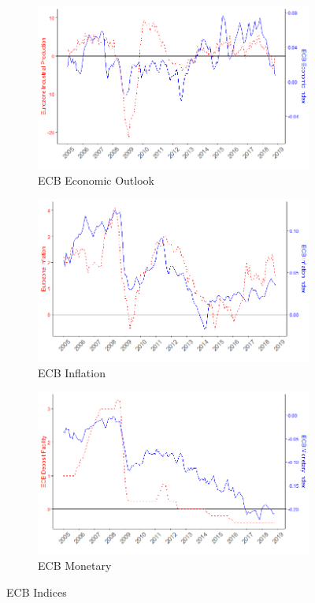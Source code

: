 \documentclass[review]{elsarticle}
\begin{document}
   \begin{figure}[h!]
    \centering
\begin{subfigure}{6cm}
    \includegraphics{ECB_eco_Industrial_prod.png}
    \caption{ECB Economic Outlook}
    \label{ECB_eco}
\end{subfigure}
\hfil
\begin{subfigure}{6cm}
    \includegraphics{ECB_inf_inf.png}
    \caption{ECB Inflation}
    \label{ECB_inf}
\end{subfigure}
\vfil
\begin{subfigure}{6cm}
    \includegraphics{ECB_mon_df.png}
    \caption{ECB Monetary}
    \label{ECB_inf}
\end{subfigure}
\caption{ECB Indices}
\label{fig:ECB Index}
    \end{figure}
\end{document}
